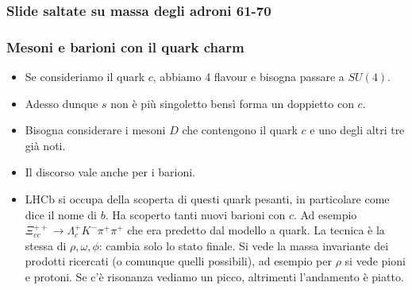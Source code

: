 \subsubsection{Slide saltate su massa degli adroni 61-70}
\subsubsection{Mesoni e barioni con il quark charm}
\begin{itemize}
\item Se consideriamo il quark $c$, abbiamo 4 flavour e bisogna passare a $SU(4)$.
\item Adesso dunque $s$ non è più singoletto bensì forma un doppietto con $c$. 
\item Bisogna considerare i mesoni $D$ che contengono il quark $c$ e uno degli altri tre già noti.
\item Il discorso vale anche per i barioni.
\item LHCb si occupa della scoperta di questi quark pesanti, in particolare come dice il nome di $b$. Ha scoperto tanti nuovi barioni con $c$. Ad esempio $\Xi_{cc}^{++}\to\Lambda_c^+K^-\pi^+\pi^+$ che era predetto dal modello a quark. La tecnica è la stessa di $\rho,\omega,\phi$: cambia solo lo stato finale. Si vede la massa invariante dei prodotti ricercati (o comunque quelli possibili), ad esempio per $\rho$ si vede pioni e protoni. Se c'è risonanza vediamo un picco, altrimenti l'andamento è piatto. 
\end{itemize}
